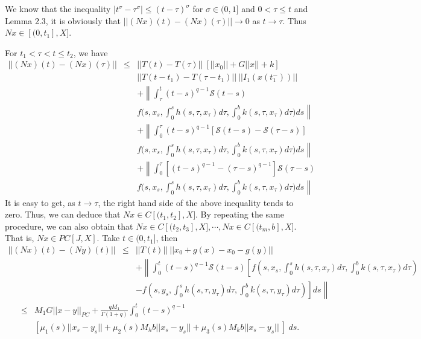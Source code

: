 \documentclass[11pt]{article}
\def \mc{\mathcal}
\begin{document}
We know that the inequality $|t^\sigma-\tau^\sigma|\leq (t-\tau)^\sigma$ for $ \sigma \in (0,1]$ and $0<\tau \leq t$ and Lemma 2.3, it is obviously that $||(Nx)(t)-(Nx)(\tau)||\rightarrow 0$ as $t \rightarrow \tau$. Thus $Nx \in [(0,t_1],X]$.
\par For $t_1<\tau<t\leq t_2$, we have
\begin{eqnarray}
||(Nx)(t)-(Nx)(\tau)||&\leq & ||T(t)-T(\tau)|| \ \left[||x_0||+G||x||+k\right] \nonumber \\ & &
||T(t-t_1)-T(\tau-t_1)|| \ ||I_1(x(t_1^-))|| \nonumber \\ & & +\left\|\int_\tau^t(t-s)^{q-1}\mc{S} (t-s) \right. \nonumber \\ & & \left.  f\Big(s,x_s,\int^s_0h(s,\tau,x_\tau)d\tau,\int^b_0k(s,\tau,x_\tau)d\tau\Big)ds\right\| \nonumber \\ & &
+\left\|\int^\tau_0 (t-s)^{q-1}\left[\mc{S} (t-s)-\mc{S} (\tau-s)\right] \right. \nonumber \\ & & \left. f\Big(s,x_s,\int^s_0h(s,\tau,x_\tau)d\tau,\int^b_0k(s,\tau,x_\tau)d\tau\Big)ds \right\| \nonumber \\ & &
+\left\|\int^\tau_0\left[(t-s)^{q-1}-(\tau-s)^{q-1}\right]\mc{S}(\tau-s) \right. \nonumber \\ & & \left. f\Big(s,x_s,\int^s_0h(s,\tau,x_\tau)d\tau,\int^b_0k(s,\tau,x_\tau)d\tau\Big)ds \right\| \nonumber 
\end{eqnarray}
It is easy to get, as $t \rightarrow \tau$, the right hand side of the above inequality tends to zero. Thus, we can deduce that $Nx \in C[(t_1,t_2],X]$. By repeating the same procedure, we can also obtain that $Nx \in C[(t_2,t_3],X], \cdots , Nx \in C[(t_m,b],X]$. That is, $Nx \in PC[J,X]$.
\noindent Take $t \in (0,t_1]$, then 
\begin{eqnarray*}
||(Nx)(t)-(Ny)(t)|| & \leq & ||T(t)|| \ ||x_0+g(x)-x_0-g(y)|| \\ & &
+\left\|\int^t_0 (t-s)^{q-1} \mc{S} (t-s) \left[f(s,x_s,\int^s_0h(s,\tau,x_\tau)d\tau,\int^b_0k(s,\tau,x_\tau)d\tau) \right. \right. \\ & & \left.\left. - f(s,y_s,\int^s_0h(s,\tau,y_\tau)d\tau,\int^b_0k(s,\tau,y_\tau)d\tau)\right]ds\right\|   
\end{eqnarray*}
\begin{eqnarray*}
& \leq & M_1G||x-y||_{PC}+\frac{qM_1}{\Gamma(1+q)}\int^t_0(t-s)^{q-1} \\ & & \left[\mu_1(s)||x_s-y_s||+\mu_2(s)M_hb||x_s-y_s||+\mu_3(s)M_kb||x_s-y_s|| \ \right] \ ds.
\end{eqnarray*}
\end{document}
